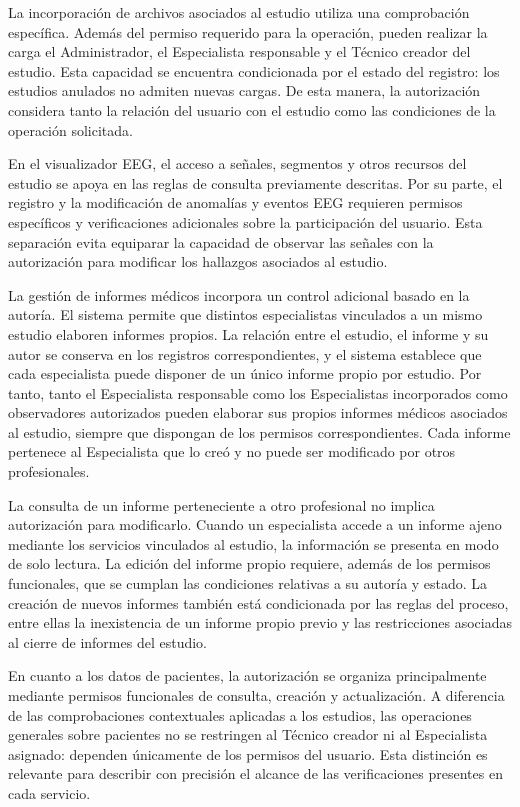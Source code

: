 La incorporación de archivos asociados al estudio utiliza una comprobación específica. Además del permiso requerido para la operación, pueden realizar la carga el Administrador, el Especialista responsable y el Técnico creador del estudio. Esta capacidad se encuentra condicionada por el estado del registro: los estudios anulados no admiten nuevas cargas. De esta manera, la autorización considera tanto la relación del usuario con el estudio como las condiciones de la operación solicitada.

En el visualizador EEG, el acceso a señales, segmentos y otros recursos del estudio se apoya en las reglas de consulta previamente descritas. Por su parte, el registro y la modificación de anomalías y eventos EEG requieren permisos específicos y verificaciones adicionales sobre la participación del usuario. Esta separación evita equiparar la capacidad de observar las señales con la autorización para modificar los hallazgos asociados al estudio.

La gestión de informes médicos incorpora un control adicional basado en la autoría. El sistema permite que distintos especialistas vinculados a un mismo estudio elaboren informes propios. La relación entre el estudio, el informe y su autor se conserva en los registros correspondientes, y el sistema establece que cada especialista puede disponer de un único informe propio por estudio. Por tanto, tanto el Especialista responsable como los Especialistas incorporados como observadores autorizados pueden elaborar sus propios informes médicos asociados al estudio, siempre que dispongan de los permisos correspondientes. Cada informe pertenece al Especialista que lo creó y no puede ser modificado por otros profesionales.


La consulta de un informe perteneciente a otro profesional no implica autorización para modificarlo. Cuando un especialista accede a un informe ajeno mediante los servicios vinculados al estudio, la información se presenta en modo de solo lectura. La edición del informe propio requiere, además de los permisos funcionales, que se cumplan las condiciones relativas a su autoría y estado. La creación de nuevos informes también está condicionada por las reglas del proceso, entre ellas la inexistencia de un informe propio previo y las restricciones asociadas al cierre de informes del estudio.

En cuanto a los datos de pacientes, la autorización se organiza principalmente mediante permisos funcionales de consulta, creación y actualización. A diferencia de las comprobaciones contextuales aplicadas a los estudios, las operaciones generales sobre pacientes no se restringen al Técnico creador ni al Especialista asignado: dependen únicamente de los permisos del usuario. Esta distinción es relevante para describir con precisión el alcance de las verificaciones presentes en cada servicio.

